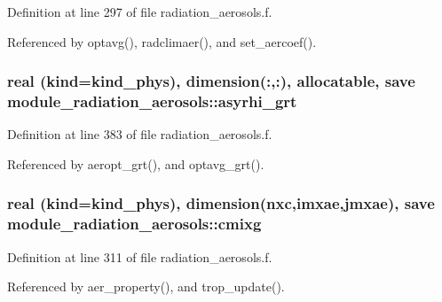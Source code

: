 Definition at line 297 of file radiation\+\_\+aerosols.\+f.



Referenced by optavg(), radclimaer(), and set\+\_\+aercoef().

\subsubsection[{\texorpdfstring{asyrhi\+\_\+grt}{asyrhi_grt}}]{\setlength{\rightskip}{0pt plus 5cm}real (kind=kind\+\_\+phys), dimension(\+:,\+:), allocatable, save module\+\_\+radiation\+\_\+aerosols\+::asyrhi\+\_\+grt\hspace{0.3cm}{\ttfamily [private]}}\hypertarget{namespacemodule__radiation__aerosols_a4b5f80817af9f2116618d6c8f0e194de}{}\label{namespacemodule__radiation__aerosols_a4b5f80817af9f2116618d6c8f0e194de}


Definition at line 383 of file radiation\+\_\+aerosols.\+f.



Referenced by aeropt\+\_\+grt(), and optavg\+\_\+grt().

\subsubsection[{\texorpdfstring{cmixg}{cmixg}}]{\setlength{\rightskip}{0pt plus 5cm}real (kind=kind\+\_\+phys), dimension({\bf nxc},{\bf imxae},{\bf jmxae}), save module\+\_\+radiation\+\_\+aerosols\+::cmixg\hspace{0.3cm}{\ttfamily [private]}}\hypertarget{namespacemodule__radiation__aerosols_a358c83599fb321a59c958e54d9f284d9}{}\label{namespacemodule__radiation__aerosols_a358c83599fb321a59c958e54d9f284d9}


Definition at line 311 of file radiation\+\_\+aerosols.\+f.



Referenced by aer\+\_\+property(), and trop\+\_\+update().

